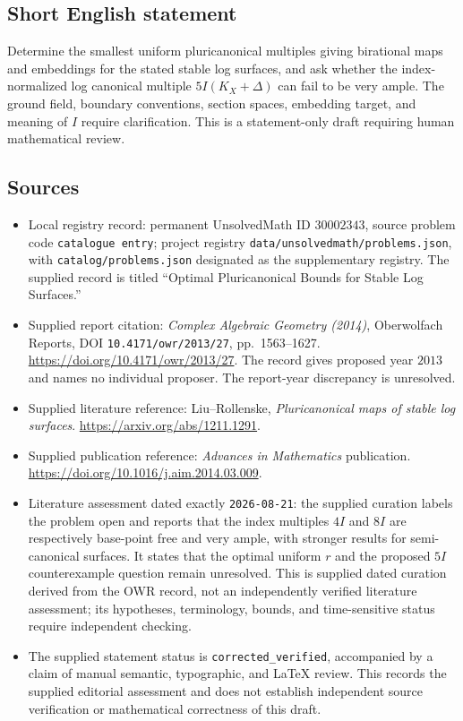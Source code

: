 \documentclass[11pt]{article}
\begin{document}
\subsection{Short English statement}
Determine the smallest uniform pluricanonical multiples giving birational maps and embeddings for the stated stable log surfaces, and ask whether the index-normalized log canonical multiple $5I(K_X+\Delta)$ can fail to be very ample. The ground field, boundary conventions, section spaces, embedding target, and meaning of $I$ require clarification. This is a statement-only draft requiring human mathematical review.
\subsection{Sources}
\begin{itemize}
\item Local registry record: permanent UnsolvedMath ID $30002343$, source problem code \texttt{catalogue entry}; project registry \texttt{data/unsolvedmath/problems.json}, with \texttt{catalog/problems.json} designated as the supplementary registry. The supplied record is titled ``Optimal Pluricanonical Bounds for Stable Log Surfaces.''
\item Supplied report citation: \emph{Complex Algebraic Geometry (2014)}, Oberwolfach Reports, DOI \texttt{10.4171/owr/2013/27}, pp.\ 1563--1627. \url{https://doi.org/10.4171/owr/2013/27}. The record gives proposed year $2013$ and names no individual proposer. The report-year discrepancy is unresolved.
\item Supplied literature reference: Liu--Rollenske, \emph{Pluricanonical maps of stable log surfaces}. \url{https://arxiv.org/abs/1211.1291}.
\item Supplied publication reference: \emph{Advances in Mathematics} publication. \url{https://doi.org/10.1016/j.aim.2014.03.009}.
\item Literature assessment dated exactly \texttt{2026-08-21}: the supplied curation labels the problem open and reports that the index multiples $4I$ and $8I$ are respectively base-point free and very ample, with stronger results for semi-canonical surfaces. It states that the optimal uniform $r$ and the proposed $5I$ counterexample question remain unresolved. This is supplied dated curation derived from the OWR record, not an independently verified literature assessment; its hypotheses, terminology, bounds, and time-sensitive status require independent checking.
\item The supplied statement status is \texttt{corrected\_verified}, accompanied by a claim of manual semantic, typographic, and LaTeX review. This records the supplied editorial assessment and does not establish independent source verification or mathematical correctness of this draft.
\end{itemize}
\end{document}
